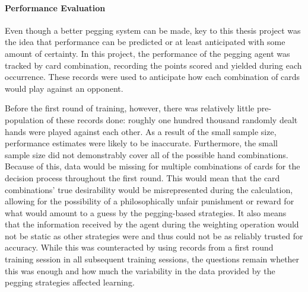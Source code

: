 \paragraph*{Performance Evaluation}

Even though a better pegging system can be made,
key to this thesis project was the idea that performance can be predicted
or at least anticipated with some amount of certainty.
%
In this project,
the performance of the pegging agent was tracked by card combination,
recording the points scored and yielded during each occurrence.
%
These records were used to anticipate how each combination of cards would
play against an opponent.

Before the first round of training,
however,
there was relatively little pre-population of these records done:
roughly one hundred thousand randomly dealt hands were played against each
other.
%
As a result of the small sample size,
performance estimates were likely to be inaccurate.
%
Furthermore,
the small sample size did not demonstrably cover all of the possible hand
combinations.
%
Because of this,
data would be missing for multiple combinations of cards
for the decision process
throughout the first round.
%
This would mean that the card combinations' true desirability would be
misrepresented during the calculation,
allowing for the possibility of a philosophically unfair
punishment or reward for what would amount to a guess by the
pegging-based strategies.
%
It also means that the information received by the agent during the weighting
operation would not be static as other strategies were and thus could not be as
reliably trusted for accuracy.
%
While
this was counteracted by using records from a first round training session in 
all subsequent training sessions,
the questions remain whether this was enough
and how much the variability in the data provided by the pegging strategies
affected learning.

